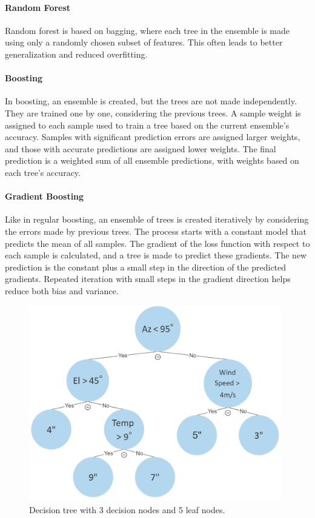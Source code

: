 \paragraph{Random Forest}
Random forest is based on bagging, where each tree in the ensemble is made using only a randomly chosen subset of features.
This often leads to better generalization and reduced overfitting.

\paragraph{Boosting}
In boosting, an ensemble is created, but the trees are not made independently.
They are trained one by one, considering the previous trees.
A sample weight is assigned to each sample used to train a tree based on the current ensemble's accuracy.
Samples with significant prediction errors are assigned larger weights, and those with accurate predictions are assigned lower weights.
The final prediction is a weighted sum of all ensemble predictions, with weights based on each tree's accuracy.

\paragraph{Gradient Boosting}
Like in regular boosting, an ensemble of trees is created iteratively by considering the errors made by previous trees.
The process starts with a constant model that predicts the mean of all samples.
The gradient of the loss function with respect to each sample is calculated, and a tree is made to predict these gradients.
The new prediction is the constant plus a small step in the direction of the predicted gradients.
Repeated iteration with small steps in the gradient direction helps reduce both bias and variance.




\begin{figure}[H]
    \centering
    \includegraphics[width=0.98\textwidth]{Other figures/decisiontree_example.PNG}
    \caption{Decision tree with 3 decision nodes and 5 leaf nodes.}
    \label{fig:decitiontree}
\end{figure}

